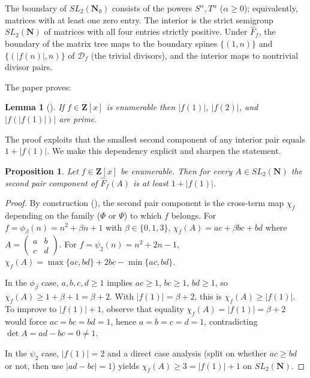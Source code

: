 \documentclass[11pt]{article}
\newtheorem{lemma}[theorem]{Lemma}
\newtheorem{proposition}[theorem]{Proposition}
\theoremstyle{definition}
\newcommand{\N}{\mathbf{N}}
\newcommand{\Nz}{\mathbf{N}_0}
\newcommand{\Z}{\mathbf{Z}}
\newcommand{\SLNz}{SL_2(\Nz)}
\newcommand{\SLN}{SL_2(\N)}
\newcommand{\Df}{\mathcal{D}_f}
\newcommand{\Ff}{\hat{F}_f}
\begin{document}
The boundary of $\SLNz$ consists of the powers $S^\alpha,T^\alpha$ ($\alpha \ge 0$); equivalently, matrices with at least one zero entry. The interior is the strict semigroup $\SLN$ of matrices with all four entries strictly positive. Under $\Ff$, the boundary of the matrix tree maps to the boundary spines $\{(1,n)\}$ and $\{(|f(n)|,n)\}$ of $\Df$ (the trivial divisors), and the interior maps to nontrivial divisor pairs.

The paper \cite{shakov} proves:

\begin{lemma}[]\label{lem:original}
If $f \in \Z[x]$ is enumerable then $|f(1)|$, $|f(2)|$, and $|f(|f(1)|)|$ are prime.
\end{lemma}

The proof exploits that the smallest second component of any interior pair equals $1+|f(1)|$. We make this dependency explicit and sharpen the statement.

\begin{proposition}\label{prop:min-cross-term}
Let $f \in \Z[x]$ be enumerable. Then for every $A \in \SLN$ the second pair component of $\Ff(A)$ is at least $1+|f(1)|$.
\end{proposition}

\begin{proof}
By construction (\cite[Sec.~2]{shakov}), the second pair component is the cross-term map $\chi_f$ depending on the family ($\Phi$ or $\Psi$) to which $f$ belongs. For $f = \phi_\beta(n) = n^2+\beta n+1$ with $\beta \in \{0,1,3\}$, $\chi_f(A) = ac+\beta bc + bd$ where $A = \begin{pmatrix}a & b \\ c & d\end{pmatrix}$. For $f = \psi_2(n) = n^2+2n-1$, $\chi_f(A) = \max\{ac,bd\} + 2bc - \min\{ac,bd\}$.

In the $\phi_\beta$ case, $a,b,c,d \ge 1$ implies $ac \ge 1$, $bc \ge 1$, $bd \ge 1$, so $\chi_f(A) \ge 1 + \beta + 1 = \beta+2$. With $|f(1)| = \beta+2$, this is $\chi_f(A) \ge |f(1)|$. To improve to $|f(1)|+1$, observe that equality $\chi_f(A)=|f(1)|=\beta+2$ would force $ac = bc = bd = 1$, hence $a=b=c=d=1$, contradicting $\det A = ad-bc = 0 \ne 1$.

In the $\psi_2$ case, $|f(1)| = 2$ and a direct case analysis (split on whether $ac \ge bd$ or not, then use $|ad-bc|=1$) yields $\chi_f(A) \ge 3 = |f(1)|+1$ on $\SLN$.
\end{proof}
\end{document}
